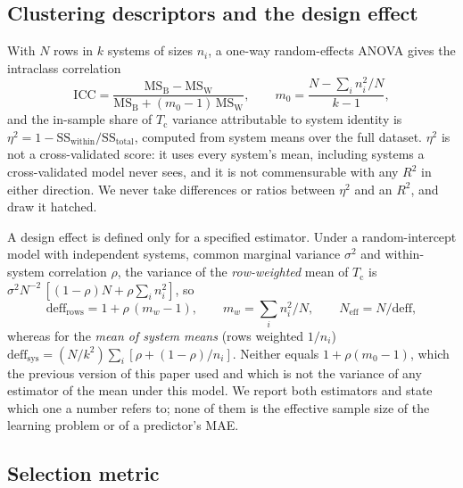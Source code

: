\documentclass{iopjournal}
\newcommand{\Tc}{T_{\mathrm c}}
\newcommand{\Rsq}{R^{2}}
\newcommand{\ICC}{\mathrm{ICC}}
\newcommand{\Neff}{N_{\mathrm{eff}}}
\begin{document}
\subsection{Clustering descriptors and the design effect}
\label{sec:cluster}

With $N$ rows in $k$ systems of sizes $n_i$, a one-way random-effects ANOVA gives the intraclass
correlation
\begin{equation}
\ICC = \frac{\mathrm{MS_B} - \mathrm{MS_W}}{\mathrm{MS_B} + (m_0 - 1)\,\mathrm{MS_W}},
\qquad
m_0 = \frac{N - \sum_i n_i^2 / N}{k - 1},
\label{eq:icc}
\end{equation}
and the in-sample share of $\Tc$ variance attributable to system identity is
$\eta^2 = 1 - \mathrm{SS_{within}}/\mathrm{SS_{total}}$, computed from system means over the full
dataset. $\eta^2$ is not a cross-validated score: it uses every system's mean, including systems a
cross-validated model never sees, and it is not commensurable with any $\Rsq$ in either direction.
We never take differences or ratios between $\eta^2$ and an $\Rsq$, and draw it hatched.

A design effect is defined only for a specified estimator. Under a random-intercept model with
independent systems, common marginal variance $\sigma^2$ and within-system correlation $\rho$, the
variance of the \emph{row-weighted} mean of $\Tc$ is
$\sigma^2 N^{-2}\,[(1-\rho)N + \rho\sum_i n_i^2]$, so
\begin{equation}
\mathrm{deff}_{\mathrm{rows}} = 1 + \rho\,(m_w - 1), \qquad m_w = \sum_i n_i^2 / N,
\qquad \Neff = N/\mathrm{deff},
\label{eq:deff}
\end{equation}
whereas for the \emph{mean of system means} (rows weighted $1/n_i$)
$\mathrm{deff}_{\mathrm{sys}} = (N/k^2)\sum_i[\rho + (1-\rho)/n_i]$. Neither equals
$1 + \rho(m_0 - 1)$, which the previous version of this paper used and which is not the variance
of any estimator of the mean under this model. We report both estimators and state which one a
number refers to; none of them is the effective sample size of the learning problem or of a
predictor's MAE.

\subsection{Selection metric}
\label{sec:screening}
\end{document}
